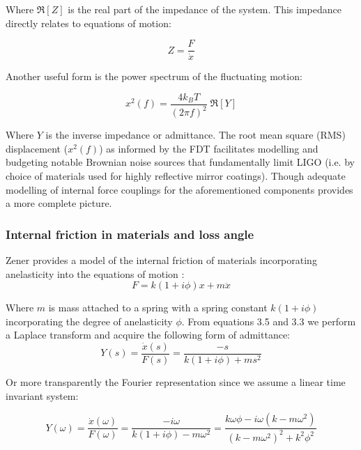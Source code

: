 \noindent Where $\Re[Z]$ is the real part of the impedance of the system. This impedance directly relates to equations of motion:

 \begin{equation}
 Z = \frac{F}{\dot{x}}
 \end{equation}

 \noindent Another useful form is the power spectrum of the fluctuating motion:

\begin{equation}\label{eq:fdtpsd}
x^2 (f)  = \frac{4k_B T}{(2 \pi f)^2}\; \Re[Y]
\end{equation}

\noindent Where $Y$ is the inverse impedance or admittance. The root mean square (RMS) displacement ($x^2(f)$) as informed by the FDT facilitates modelling and budgeting notable Brownian noise sources that fundamentally limit LIGO (i.e. by choice of materials used for highly reflective mirror coatings). Though adequate modelling of internal force couplings for the aforementioned components provides a more complete picture.

\subsubsection*{Internal friction in materials and loss angle}
Zener provides a model of the internal friction of materials incorporating anelasticity into the equations of motion \cite{zener:1948}:
\begin{equation}
F = k(1+i\phi)x + m\ddot{x}
\end{equation}

\noindent Where $m$ is mass attached to a spring with a spring constant $k(1+ i\phi)$ incorporating the degree of anelasticity $\phi$. From equations 3.5 and 3.3 we perform a Laplace transform and acquire the following form of admittance:
\begin{equation}
Y(s) = \frac{\dot{x}(s)}{F(s)} = \frac{-s}{k(1+i\phi) + ms^2}
\end{equation}

\noindent Or more transparently the Fourier representation since we assume a linear time invariant system:

\begin{equation}\label{eq:admitint}
Y(\omega) = \frac{\dot{x}(\omega)}{F(\omega)} = \frac{-i\omega}{k(1+i\phi) - m\omega^2} = \frac{k \omega \phi - i \omega (k - m \omega^2)}{(k-m\omega^2)^2 +k^2 \phi^2}
\end{equation}

